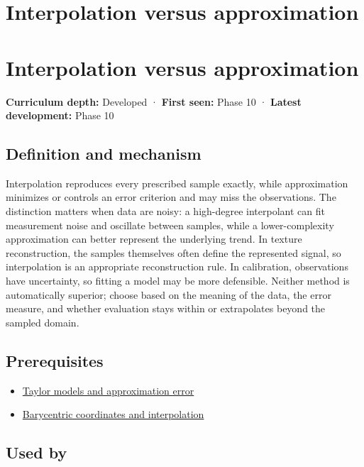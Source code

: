\hypertarget{appendix-0c2a5f69851e}{}
\section*{Interpolation versus approximation}
\section{Interpolation versus approximation}\label{appendix-0c2a5f69851e-interpolation-versus-approximation}

\textbf{Curriculum depth:} Developed · \textbf{First seen:} Phase 10 · \textbf{Latest development:} Phase 10

\subsection{Definition and mechanism}\label{appendix-0c2a5f69851e-definition-and-mechanism}

Interpolation reproduces every prescribed sample exactly, while approximation minimizes or controls an error criterion and may miss the observations. The distinction matters when data are noisy: a high-degree interpolant can fit measurement noise and oscillate between samples, while a lower-complexity approximation can better represent the underlying trend. In texture reconstruction, the samples themselves often define the represented signal, so interpolation is an appropriate reconstruction rule. In calibration, observations have uncertainty, so fitting a model may be more defensible. Neither method is automatically superior; choose based on the meaning of the data, the error measure, and whether evaluation stays within or extrapolates beyond the sampled domain.

\subsection{Prerequisites}\label{appendix-0c2a5f69851e-prerequisites}

\begin{itemize}
\tightlist
\item
  \hyperref[appendix-32f39e9a3738]{Taylor models and approximation error}
\item
  \hyperref[appendix-02b9d9a81dca]{Barycentric coordinates and interpolation}
\end{itemize}

\subsection{Used by}\label{appendix-0c2a5f69851e-used-by}

